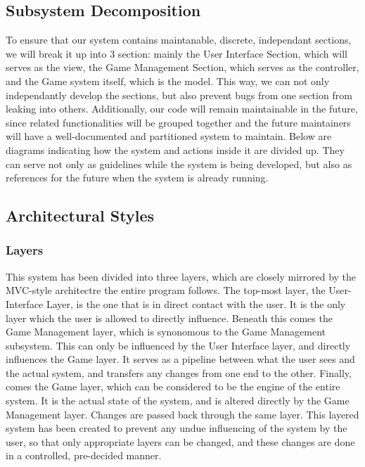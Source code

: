 \documentclass[12pt]{article} %
\begin{document}

\subsection{Subsystem Decomposition} %

To ensure that our system contains maintanable, discrete, independant sections, we will break it up into 3 section: mainly the User Interface Section, which will serves as the view, the Game Management Section, which serves as the controller, and the Game system itself, which is the model. This way, we can not only independantly develop the sections, but also prevent bugs from one section from leaking into others. Additionally, our code will remain maintainable in the future, since related functionalities will be grouped together and the future maintainers will have a well-documented and partitioned system to maintain.
\indent Below are diagrams indicating how the system and actions inside it are divided up. They can serve not only as guidelines while the system is being developed, but also as references for the future when the system is already running.


\subsection{Architectural Styles} %


\subsubsection{Layers} %

This system has been divided into three layers, which are closely mirrored by the MVC-style architectre the entire program follows. The top-most layer, the User-Interface Layer, is the one that is in direct contact with the user. It is the only layer which the user is allowed to directly influence. Beneath this comes the Game Management layer, which is synonomous to the Game Management subsystem. This can only be influenced by the User Interface layer, and directly influences the Game layer. It serves as a pipeline between what the user sees and the actual system, and transfers any changes from one end to the other. Finally, comes the Game layer, which can be considered to be the engine of the entire system. It is the actual state of the system, and is altered directly by the Game Management layer. Changes are passed back through the same layer. This layered system has been created to prevent any undue influencing of the system by the user, so that only appropriate layers can be changed, and these changes are done in a controlled, pre-decided manner.
\end{document}
